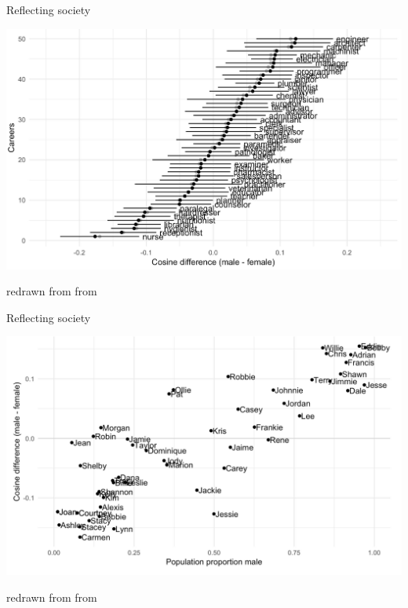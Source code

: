 \documentclass{hertieteaching}
\begin{document}
\begin{frame}{Reflecting society}

\centerline{\includegraphics[scale = 0.5]{pictures/occupations-detail}}

redrawn from from \textcite{Caliskan.etal2017}

\end{frame}

\begin{frame}{Reflecting society}

\centerline{\includegraphics[scale = 0.4]{pictures/names-gender}}

redrawn from from \textcite{Caliskan.etal2017}

\end{frame}
\end{document}
